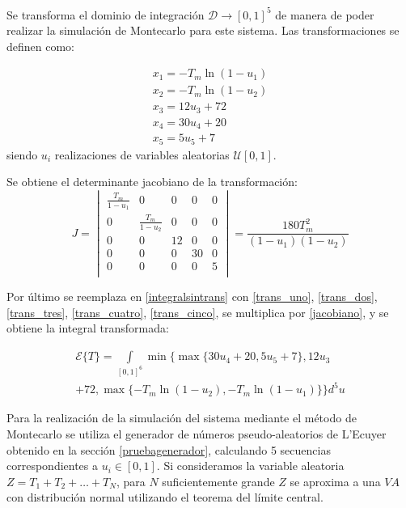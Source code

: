 \documentclass{sig-alternate}
\begin{document}
Se transforma el dominio de integraci\'on $\mathcal{D} \to [0,1]^5$ de manera de poder 
realizar la simulaci\'on de Montecarlo para este sistema. Las transformaciones se definen como:

\begin{eqnarray}
	\label{trans_uno}
	x_1 = - T_m \ln (1 - u_1) \\
	\label{trans_dos}
	x_2 = - T_m \ln (1 - u_2) \\
	\label{trans_tres}
	x_3 = 12 u_3 + 72 \\
	\label{trans_cuatro}
	x_4 = 30 u_4 + 20 \\
	\label{trans_cinco}
	x_5 = 5 u_5 + 7
\end{eqnarray}
siendo $u_i$ realizaciones de variables aleatorias $\mathcal{U}[0,1]$.

Se obtiene el determinante jacobiano de la transformaci\'on:
\begin{equation}
	\label{jacobiano}
	J =
		\begin{vmatrix}
			\frac{T_m}{1 - u_1} & 0  & 0  & 0  & 0 \\
			0 & \frac{T_m}{1 - u_2} & 0  & 0  & 0  \\
			0 & 0 & 12 & 0 & 0 \\
			0 & 0 & 0 & 30  & 0 \\
			0 & 0 & 0 & 0 & 5 \\
		\end{vmatrix}
	=
		\frac{180 T_m^2}{(1-u_1)(1-u_2)}
\end{equation}

Por \'ultimo se reemplaza en \eqref{integralsintrans} con
\eqref{trans_uno}, \eqref{trans_dos}, \eqref{trans_tres}, \eqref{trans_cuatro}, \eqref{trans_cinco}, 
se multiplica por \eqref{jacobiano}, y se obtiene la integral transformada:

\begin{eqnarray}
\label{integralcontrans}
	\mathcal{E} \{ T \} =	\int\limits_{[0,1]^6} \min\{ \max \{ 30 u_4 + 20, 5 u_5 + 7 \} , 12 u_3
	\nonumber
	\\
	 + 72 , \max \{- T_m \ln (1 - u_2), - T_m \ln (1 - u_1)\}\} d^5u
\end{eqnarray}

Para la realizaci\'on de la simulaci\'on del sistema mediante el m\'etodo de Montecarlo 
se utiliza el generador de n\'umeros pseudo-aleatorios de L'Ecuyer obtenido en la secci\'on \ref{pruebagenerador},
calculando 5 secuencias correspondientes a $u_i \in [0,1]$.
Si consideramos la variable aleatoria $Z = T_{1} + T_{2} + \dots + T_{N}$,
para $N$ suficientemente grande $Z$ se aproxima a una $VA$ con distribuci\'{o}n
normal utilizando el teorema del l\'{i}mite central.
\end{document}
